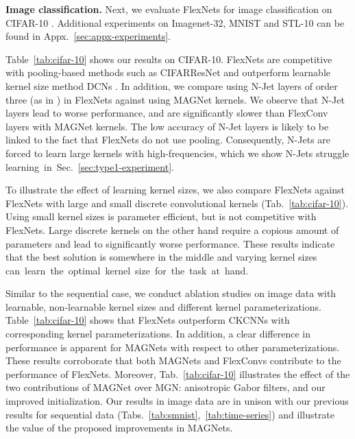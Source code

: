 \documentclass{article} \usepackage{iclr2022_conference,times}
\begin{document}
\textbf{Image classification.}
Next, we evaluate FlexNets for image classification on CIFAR-10 \citep{krizhevsky2009learning}.  Additional experiments on Imagenet-32, MNIST and STL-10 can be found in Appx.~\ref{sec:appx-experiments}.

Table~\ref{tab:cifar-10} shows our results on CIFAR-10. 
FlexNets are competitive with pooling-based methods such as CIFARResNet 
\citep{he2016deep} and outperform learnable kernel size method DCNs \citep{tomen2021deep}.
In addition, we compare using N-Jet layers of order three (as in \citet{pintea2021resolution}) in FlexNets against using MAGNet kernels. We observe that N-Jet layers lead to worse performance, and are significantly slower than FlexConv layers with MAGNet kernels. The low accuracy of N-Jet layers is likely to be linked to the fact that FlexNets do not use pooling. Consequently, N-Jets are forced to learn large kernels with high-frequencies, which we show N-Jets struggle learning~in~Sec.~\ref{sec:type1-experiment}.

To illustrate the effect of learning kernel sizes, we also compare FlexNets against FlexNets with large and small discrete convolutional kernels (Tab.~\ref{tab:cifar-10}).
Using small kernel sizes is parameter efficient, but is not competitive with FlexNets. Large discrete kernels on the other hand require a copious amount of parameters and lead to significantly worse performance. These results indicate that the best solution is somewhere in the middle and varying kernel sizes can~learn~the~optimal~kernel~size~for~the~task~at~hand.


Similar to the sequential case, we conduct ablation studies on image data with learnable, non-learnable kernel sizes and different kernel parameterizations. Table~\ref{tab:cifar-10} shows that FlexNets outperform CKCNNs with corresponding kernel parameterizations. In addition, a clear difference in performance is apparent for MAGNets with respect to other parameterizations. These results corroborate that both MAGNets and FlexConvs contribute to the performance of FlexNets. Moreover, Tab.~\ref{tab:cifar-10} illustrates the effect of the two contributions of MAGNet over MGN: anisotropic Gabor filters, and our improved initialization. Our results in image data are in unison with our previous results for sequential data (Tabs.~\ref{tab:smnist},~\ref{tab:time-series}) and illustrate the value of the proposed improvements in MAGNets.
\vspace{-2mm}
\end{document}
